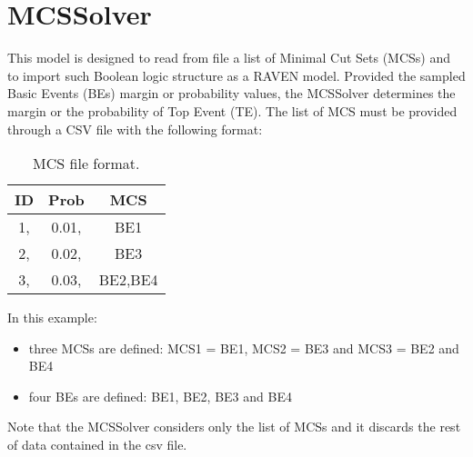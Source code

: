 \section{MCSSolver}
\label{sec:MCSSolver}

This model is designed to read from file a list of Minimal Cut Sets (MCSs) and to import such Boolean logic structure as a RAVEN model.
Provided the sampled Basic Events (BEs) margin or probability values, the MCSSolver determines the margin or the probability 
of Top Event (TE).
The list of MCS must be provided through a CSV file with the following format:

\begin{table}
  \begin{center}
    \caption{MCS file format.}
    \label{tab:table1}
    \begin{tabular}{c|c|c} 
      \textbf{ID} & \textbf{Prob} & \textbf{MCS}\\
      \hline
      1, & 0.01, & BE1\\
      2, & 0.02, & BE3\\
      3, & 0.03, & BE2,BE4\\
    \end{tabular}
  \end{center}
\end{table}

In this example:
\begin{itemize}
  \item three MCSs are defined: MCS1 = BE1, MCS2 = BE3 and MCS3 = BE2 and BE4 
  \item four BEs are defined: BE1, BE2, BE3 and BE4
\end{itemize}

Note that the MCSSolver considers only the list of MCSs and it discards the rest of data contained in the csv file.

